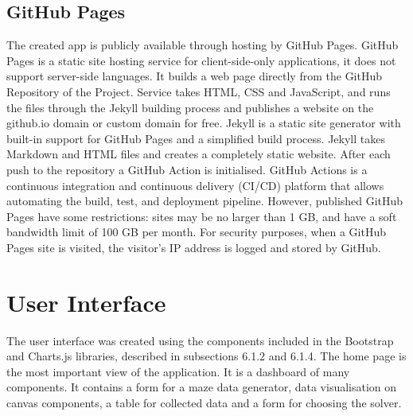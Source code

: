\subsection{GitHub Pages}
The created app is publicly available through hosting by GitHub Pages\cite{28}. GitHub Pages is a static site hosting service for client-side-only applications, it does not support
server-side languages. It builds a web page directly from the GitHub Repository of the Project. Service takes HTML, CSS and JavaScript, and runs the files through
the Jekyll building process and publishes a website on the github.io domain or custom domain for free. Jekyll is a static site generator with built-in support for 
GitHub Pages and a simplified build process. Jekyll takes Markdown and HTML files and creates a completely static website. After each push to the repository a GitHub
Action is initialised. GitHub Actions is a continuous integration and continuous delivery (CI/CD) platform that allows automating the build, test, and deployment
pipeline. However, published GitHub Pages have some restrictions: sites may be no larger than 1 GB, and have a soft bandwidth limit of 100 GB per month. For security purposes, 
when a GitHub Pages site is visited, the visitor's IP address is logged and stored by GitHub.\\  
\section{User Interface}
The user interface was created using the components included in the Bootstrap and Charts.js libraries, described in subsections 6.1.2 and 6.1.4.
The home page is the most important view of the application. It is a dashboard of many components. It contains a form for a maze data generator, data visualisation
on canvas components, a table for collected data and a form for choosing the solver.\\
